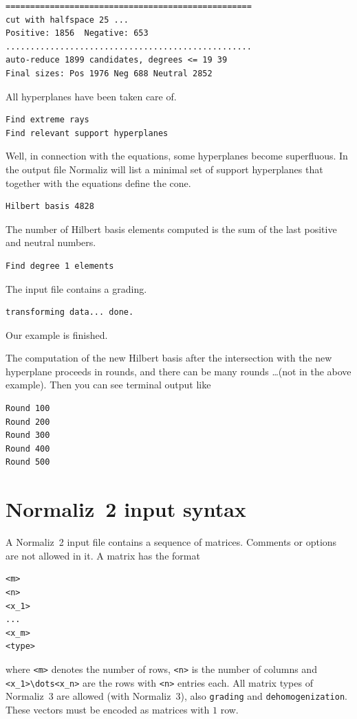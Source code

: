 \begin{Verbatim}
==================================================
cut with halfspace 25 ...
Positive: 1856  Negative: 653
..................................................
auto-reduce 1899 candidates, degrees <= 19 39 
Final sizes: Pos 1976 Neg 688 Neutral 2852
\end{Verbatim}
All hyperplanes have been taken care of.
\begin{Verbatim}
Find extreme rays
Find relevant support hyperplanes
\end{Verbatim}
Well, in connection with the equations, some hyperplanes become superfluous. In the output file Normaliz will list a minimal set of support hyperplanes that together with the equations define the cone.
\begin{Verbatim}
Hilbert basis 4828
\end{Verbatim}
The number of Hilbert basis elements computed is the sum of the last positive and neutral numbers.
\begin{Verbatim}
Find degree 1 elements
\end{Verbatim}
The input file contains a grading.
\begin{Verbatim}
transforming data... done.
\end{Verbatim}
Our example is finished.

The computation of the new Hilbert basis after the intersection with the new hyperplane proceeds in rounds, and there can be many rounds \dots (not in the above example). Then you can see terminal output like
\begin{Verbatim}
Round 100
Round 200
Round 300
Round 400
Round 500
\end{Verbatim}

\newpage

\section{Normaliz~2 input syntax}\label{OldSyntax}

A Normaliz~2 input file contains a sequence of matrices. Comments or options are not allowed in it. A matrix has the format
\begin{Verbatim}
<m>
<n>
<x_1>
...
<x_m>
<type>
\end{Verbatim}
where \verb|<m>| denotes the number of rows, \verb|<n>| is the number of columns and \verb|<x_1>\dots<x_n>| are the rows with \verb|<n>| entries each. All matrix types of Normaliz~3 are allowed (with Normaliz~3), also \verb|grading| and \verb|dehomogenization|. These vectors must be encoded as matrices with $1$ row.

